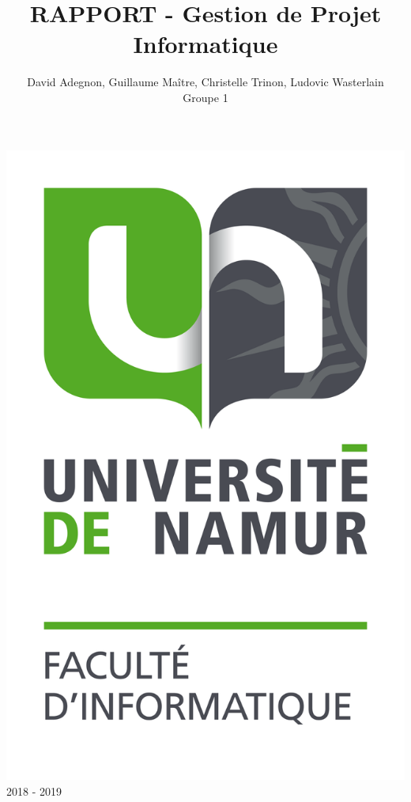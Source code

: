 \documentclass[t, 12pt, usenames,dvipsnames]{article}
\title{RAPPORT - Gestion de Projet Informatique}
\author{David Adegnon, Guillaume Maître, Christelle Trinon, Ludovic Wasterlain\\Groupe 1}
\begin{document}
    \begin{titlepage}
        \maketitle
        
        \begin{center}
            \includegraphics[scale=0.5]{images/FAC_info.png} \\
            2018 - 2019
        \end{center}
    
    \end{titlepage}

    
\end{document}
